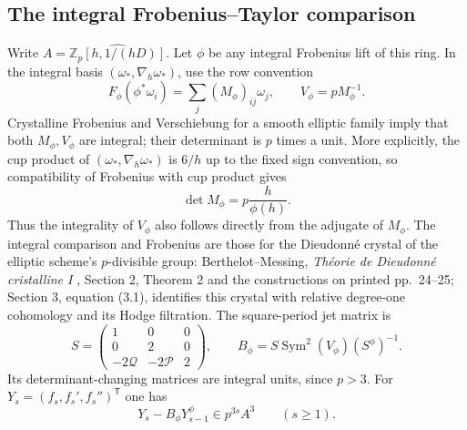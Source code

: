 \documentclass[11pt,letterpaper]{article}
\theoremstyle{definition}
\theoremstyle{remark}
\begin{document}
\subsection{The integral Frobenius--Taylor comparison}

Write $A=\widehat{\mathbb Z_p[h,1/(hD)]}$. Let $\phi$ be any integral
Frobenius lift of this ring. In the integral basis
$(\omega_*,\nabla_h\omega_*)$, use the row convention
\[
 F_\phi(\phi^*\omega_i)=\sum_j(M_\phi)_{ij}\omega_j,
 \qquad V_\phi=pM_\phi^{-1}.
\]
Crystalline Frobenius and Verschiebung for a smooth elliptic family imply
that both $M_\phi,V_\phi$ are integral; their determinant is $p$ times
a unit. More explicitly, the cup product of
$(\omega_*,\nabla_h\omega_*)$ is $6/h$ up to the fixed sign convention,
so compatibility of Frobenius with cup product gives
\[
 \det M_\phi=p\frac{h}{\phi(h)}.
\]
Thus the integrality of $V_\phi$ also follows directly from the adjugate
of $M_\phi$. The integral comparison and Frobenius are those for the
Dieudonn\'e crystal of the elliptic scheme's $p$-divisible group:
Berthelot--Messing, \emph{Th\'eorie de Dieudonn\'e cristalline I} \cite{I:BM},
Section 2, Theorem 2 and the constructions on printed pp.\ 24--25;
Section 3, equation (3.1), identifies this crystal with relative
degree-one cohomology and its Hodge filtration.
The square-period jet matrix is
\[
 S=\begin{pmatrix}1&0&0\\0&2&0\\-2\mathcal Q&-2\mathcal P&2\end{pmatrix},
 \qquad B_\phi=S\operatorname{Sym}^2(V_\phi)(S^\phi)^{-1}.
\]
Its determinant-changing matrices are integral units, since $p>3$.
For $Y_s=(f_s,f_s',f_s'')^{\mathsf T}$ one has
\begin{equation}\label{I:ap:jet}
 Y_s-B_\phi Y_{s-1}^\phi\in p^{3s}A^3\qquad(s\geq1).
\end{equation}
\end{document}
